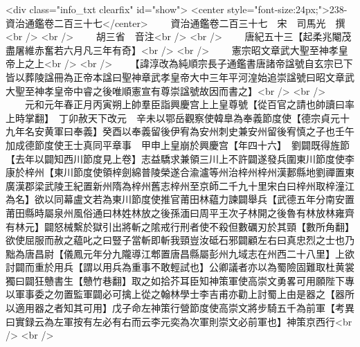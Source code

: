 <div class="info_txt clearfix" id="show">
<center style="font-size:24px;">238-資治通鑑卷二百三十七</center>
  　　資治通鑑卷二百三十七　宋　司馬光　撰<br />
<br />
　　胡三省　音注<br />
<br />
　　唐紀五十三【起柔兆閹茂盡屠維赤奮若六月凡三年有奇】<br />
<br />
　　憲宗昭文章武大聖至神孝皇帝上之上<br />
<br />
　　【諱淳改為純順宗長子通鑑書唐諸帝諡號自玄宗已下皆以葬陵諡冊為正帝本諡曰聖神章武孝皇帝大中三年平河湟始追崇諡號曰昭文章武大聖至神孝皇帝中睿之後唯順憲宣有尊崇諡號故因而書之】<br />
<br />
　　元和元年春正月丙寅朔上帥羣臣詣興慶宫上上皇尊號【從百官之請也帥讀曰率上時掌翻】　丁卯赦天下改元　辛未以鄂岳觀察使韓臯為奉義節度使【德宗貞元十九年名安黄軍曰奉義】癸酉以奉義留後伊宥為安州刺史兼安州留後宥慎之子也壬午加成德節度使王士真同平章事　甲申上皇崩於興慶宫【年四十六】　劉闢既得旌節【去年以闢知西川節度見上卷】志益驕求兼領三川上不許闢遂發兵圍東川節度使李康於梓州【東川節度使領梓劍綿普陵榮遂合渝瀘等州治梓州梓州漢郪縣地劉禪置東廣漢郡梁武陵王紀置新州隋為梓州舊志梓州至京師二千九十里宋白曰梓州取梓潼江為名】欲以同幕盧文若為東川節度使推官莆田林藴力諫闢舉兵【武德五年分南安置莆田縣時屬泉州風俗通曰林姓林放之後孫湎曰周平王次子林開之後魯有林放林雍齊有林元】闢怒械繫於獄引出將斬之隂戒行刑者使不殺但數礪刃於其頸【數所角翻】欲使屈服而赦之藴叱之曰豎子當斬即斬我頸豈汝砥石邪闢顧左右曰真忠烈之士也乃黜為唐昌尉【儀鳳元年分九隴導江郫置唐昌縣屬彭州九域志在州西二十八里】上欲討闢而重於用兵【謂以用兵為重事不敢輕試也】公卿議者亦以為蜀險固難取杜黄裳獨曰闢狂戇書生【戇竹巷翻】取之如拾芥耳臣知神策軍使高崇文勇畧可用願陛下專以軍事委之勿置監軍闢必可擒上從之翰林學士李吉甫亦勸上討蜀上由是器之【器所以適用器之者知其可用】戊子命左神策行營節度使高崇文將步騎五千為前軍【考異曰實録云為左軍按有左必有右而云李元奕為次軍則崇文必前軍也】神策京西行<br />
<br />
